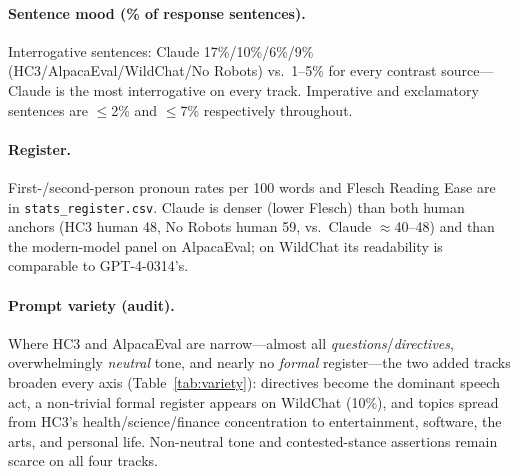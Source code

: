 \documentclass[11pt]{article}
\begin{document}
\paragraph{Sentence mood (\% of response sentences).} Interrogative sentences:
Claude 17\%/10\%/6\%/9\% (HC3/AlpacaEval/WildChat/No Robots) vs.\ 1--5\% for every
contrast source---Claude is the most interrogative on every track. Imperative and
exclamatory sentences are $\le$2\% and $\le$7\% respectively throughout.

\paragraph{Register.} First-/second-person pronoun rates per 100 words and Flesch
Reading Ease are in \texttt{stats\_register.csv}. Claude is denser (lower Flesch)
than both human anchors (HC3 human 48, No Robots human 59, vs.\ Claude
$\approx$40--48) and than the modern-model panel on AlpacaEval; on WildChat its
readability is comparable to GPT-4-0314's.

\paragraph{Prompt variety (audit).} Where HC3 and AlpacaEval are narrow---almost
all \emph{questions}/\emph{directives}, overwhelmingly \emph{neutral} tone, and
nearly no \emph{formal} register---the two added tracks broaden every axis
(Table~\ref{tab:variety}): directives become the dominant speech act, a
non-trivial formal register appears on WildChat (10\%), and topics spread from
HC3's health/science/finance concentration to entertainment, software, the arts,
and personal life. Non-neutral tone and contested-stance assertions remain scarce
on all four tracks.
\end{document}
